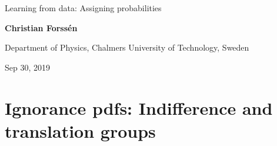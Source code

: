 \documentclass[%
oneside,                 %
final,                   %
10pt]{article}
\begin{document}

\newcommand{\exercisesection}[1]{\subsection*{#1}}







\thispagestyle{empty}

\begin{center}
{\LARGE\bf
\begin{spacing}{1.25}
Learning from data: Assigning probabilities
\end{spacing}
}
\end{center}


\begin{center}
{\bf Christian Forssén}
\end{center}

    \begin{center}
\centerline{{\small Department of Physics, Chalmers University of Technology, Sweden}}
\end{center}
    

\begin{center}
Sep 30, 2019
\end{center}

\vspace{1cm}


\section{Ignorance pdfs: Indifference and translation groups}

\end{document}
